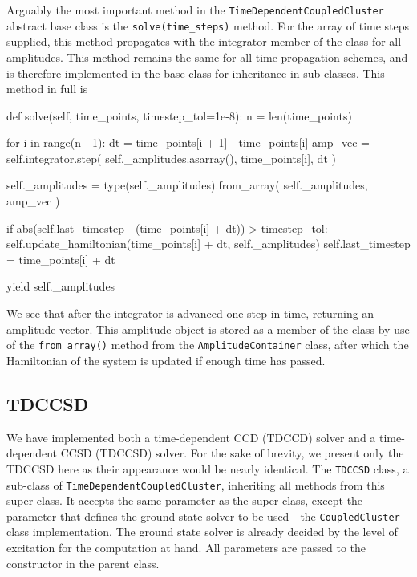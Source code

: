     Arguably the most important method in the \lstinline{TimeDependentCoupledCluster}
    abstract base class is the \lstinline{solve(time_steps)} method. For the array 
    of time steps supplied, this method propagates with the integrator member of the 
    class for all amplitudes. This method remains the same for all time-propagation 
    schemes, and is therefore implemented in the base class for inheritance in 
    sub-classes. This method in full is
    \begin{python}
    def solve(self, time_points, timestep_tol=1e-8):
        n = len(time_points)

        for i in range(n - 1):
            dt = time_points[i + 1] - time_points[i]
            amp_vec = self.integrator.step(
                self._amplitudes.asarray(), time_points[i], dt
            )

            self._amplitudes = type(self._amplitudes).from_array(
                self._amplitudes, amp_vec
            )

            if abs(self.last_timestep - (time_points[i] + dt)) > timestep_tol:
                self.update_hamiltonian(time_points[i] + dt, self._amplitudes)
                self.last_timestep = time_points[i] + dt

            yield self._amplitudes
    \end{python}
    We see that after the integrator is advanced one step in time, returning an amplitude 
    vector. This amplitude object is stored as a member of the class by use of the 
    \lstinline{from_array()} method from the \lstinline{AmplitudeContainer} class,
    after which the  
    Hamiltonian of the system is updated if enough time has passed.

    \subsection{TDCCSD}

    We have implemented both a time-dependent CCD (TDCCD) solver and a time-dependent CCSD
    (TDCCSD)
    solver. For the sake of brevity, we present only the TDCCSD here as their appearance 
    would be nearly identical. 
    The \lstinline{TDCCSD} class, a sub-class of \lstinline{TimeDependentCoupledCluster},
    inheriting all methods from this super-class. It accepts the same parameter as the super-class, except the 
    parameter that defines the ground state solver to be used - the \lstinline{CoupledCluster}
    class implementation. The ground state solver is already decided by the level of 
    excitation for the computation at hand. All parameters are passed to the constructor 
    in the parent class.

